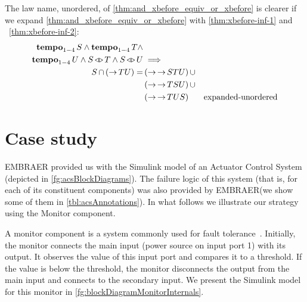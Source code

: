 \documentclass[en,twoside,onehalfspacing,phd]{risethesis}
\makeatletter
\newcommand{\todo}[1]{\@latex@warning{TODO #1}}
\newcommand{\EMBRAER}{EMBRAER\xspace}
\newcommand{\simulink}{Simulink\xspace}
\def\xbeforeop{\ensuremath\rightarrow}
\newcommand{\xbefore}[2]{\ensuremath #1 \xbeforeop #2 }
\def\tempoop{\ensuremath\operatorname{\mathbf{tempo}}}
\newcommand{\tempo}[2][1-4]{\ensuremath\tempoop_{#1} #2}
\def\independenteventsop{\ensuremath\operatorname{\triangleleft\triangleright}}
\newcommand{\independentevents}[2]{\ensuremath #1 \independenteventsop #2}
\newcommand{\parsin}[1]{\ensuremath\left( #1 \right)}
\def\union{\ensuremath\operatorname{\cup}}
\def\inter{\ensuremath\operatorname{\cap}}
\def\xbefore{\ensuremath\operatorname{\rightarrow}}
\makeatother
\begin{document}
The law name, unordered, of \eqref{thm:and_xbefore_equiv_or_xbefore} is clearer if we expand \eqref{thm:and_xbefore_equiv_or_xbefore} with \eqref{thm:xbefore-inf-1} and ~\eqref{thm:xbefore-inf-2}:
%
\begin{align}
\tempo{S} \land \tempo{T} \land \nonumber\\
  \tempo{U} \land \independentevents{S}{T} \land \independentevents{S}{U} & \implies \nonumber\\
  S \inter \parsin{\xbefore{T}{U}} = &
  \parsin{\xbefore{\xbefore{S}{T}}{U}} \union \nonumber\\
  & \parsin{\xbefore{\xbefore{T}{S}}{U}} \union \nonumber\\
  & \parsin{\xbefore{\xbefore{T}{U}}{S}} &
  \text{expanded-unordered}
  \label{thm:and_xbefore_equiv_or_xbefore_expanded}
%
%
%
\end{align}
%


\chapter{Case study}
\label{sec:case-study}

\EMBRAER provided us with the \simulink model of an Actuator Control System (depicted in \cref{fg:acsBlockDiagrams}).
The failure logic of this system (that is, for each of its constituent components) was also provided by \EMBRAER (we show some of them in \cref{tbl:acsAnnotations}).
In what follows we illustrate our strategy using the Monitor component.

A monitor component is a system commonly used for fault tolerance~\cite{ONB2002,KK2007}.
Initially, the monitor connects the main input (power source on input port 1) with its output.
It observes the value of this input port and compares it to a threshold.
If the value is below the threshold, the monitor disconnects the output from the main input and connects to the secondary input.
We present the \simulink model for this monitor in \cref{fg:blockDiagramMonitorInternals}.
\end{document}
